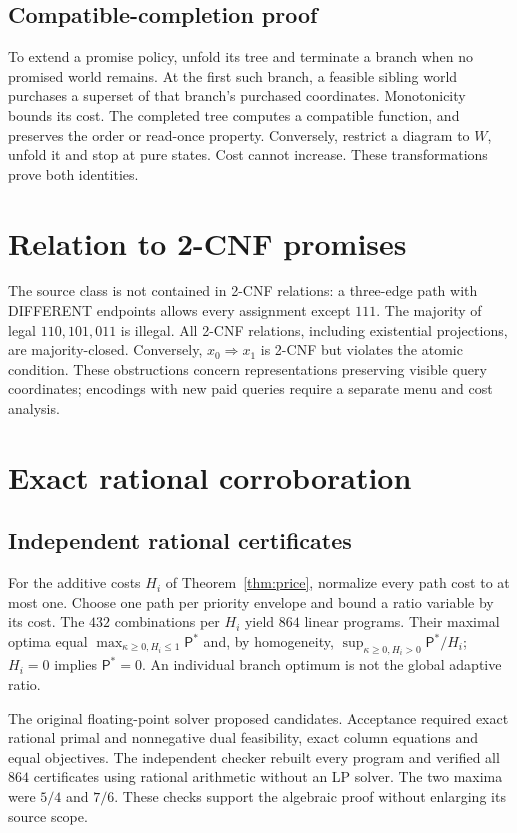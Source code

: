 \documentclass[pdflatex,sn-mathphys-num]{sn-jnl}
\newcommand{\Pcost}{\mathsf{P}}
\theoremstyle{thmstyleone}
\theoremstyle{thmstylethree}
\theoremstyle{thmstyletwo}
\begin{document}
\subsection{Compatible-completion proof}\label{app:completion}
To extend a promise policy, unfold its tree and terminate a branch when no promised world remains. At the first such branch, a feasible sibling world purchases a superset of that branch's purchased coordinates. Monotonicity bounds its cost. The completed tree computes a compatible function, and preserves the order or read-once property. Conversely, restrict a diagram to $W$, unfold it and stop at pure states. Cost cannot increase. These transformations prove both identities.

\section{Relation to 2-CNF promises}\label{app:structure}
The source class is not contained in 2-CNF relations: a three-edge path with DIFFERENT endpoints allows every assignment except $111$. The majority of legal $110,101,011$ is illegal. All 2-CNF relations, including existential projections, are majority-closed. Conversely, $x_0\Rightarrow x_1$ is 2-CNF but violates the atomic condition. These obstructions concern representations preserving visible query coordinates; encodings with new paid queries require a separate menu and cost analysis.

\section{Exact rational corroboration}\label{app:certificates}
\subsection{Independent rational certificates}
For the additive costs $H_i$ of Theorem~\ref{thm:price}, normalize every path cost to at most one. Choose one path per priority envelope and bound a ratio variable by its cost. The $432$ combinations per $H_i$ yield $864$ linear programs. Their maximal optima equal $\max_{\kappa\geq0,H_i\leq1}\Pcost^*$ and, by homogeneity, $\sup_{\kappa\geq0,H_i>0}\Pcost^*/H_i$; $H_i=0$ implies $\Pcost^*=0$. An individual branch optimum is not the global adaptive ratio.

The original floating-point solver proposed candidates. Acceptance required exact rational primal and nonnegative dual feasibility, exact column equations and equal objectives. The independent checker rebuilt every program and verified all $864$ certificates using rational arithmetic without an LP solver. The two maxima were $5/4$ and $7/6$. These checks support the algebraic proof without enlarging its source scope.
\end{document}
